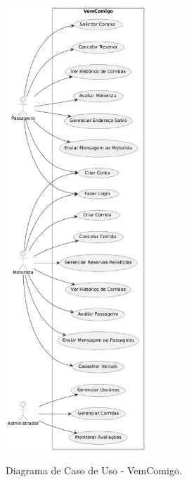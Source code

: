 \begin{anexosenv}
\begin{figure}[htb!]
	\centering
	\caption{Diagrama de Caso de Uso - VemComigo.}
	\includegraphics[width=0.47\textwidth]{img/diagrama_caso.png}
	\label{fig:diagrama_caso}
\end{figure}

\end{anexosenv}
